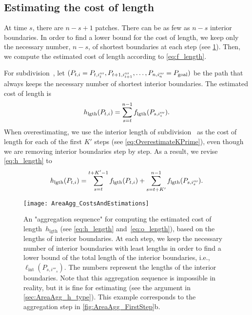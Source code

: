 \documentclass[acmsmall,natbib=false]{acmart}
\begin{document}
\subsection{Estimating the cost of length}
\label{sec:AreaAgg_h_length}

At time $s$, there are $n-s+1$ patches.
There can be as few as $n-s$ interior boundaries.
In order to find a lower bound for the cost of length,
we keep only the necessary number, $n-s$, 
of shortest boundaries at each step
(see \fig\ref{fig:AreaAgg_h_length}).
Then, we compute the estimated cost of length according to 
\eq\ref{eq:f_length}.

For subdivision~\Pnode, let
$(P_{t,i}=P_{t,i'''_t}, P_{t+1,i'''_{t+1}}, 
\dots,P_{n,i'''_n}=P_\mathrm{goal})$
be the path that always keeps 
the necessary number of shortest interior boundaries.
The estimated cost of length is
\begin{equation}
\label{eq:h_length}
h_\mathrm{lgth}(P_{t,i})=
\sum_{s=t}^{n-1}f_\mathrm{lgth}(P_{s,i'''_s}).
\end{equation}
When overestimating,
we use the interior length of subdivision~\Pnode
as the cost of length for each of the first $K'$ steps 
(see \eq\ref{eq:OverestimateKPrime}),
even though we are removing interior boundaries
step by step.
As a result, we revise \fo\ref{eq:h_length} to
\begin{equation}
\label{eq:o_length}
h_\mathrm{lgth}(P_{t,i})=
\sum_{s=t}^{t+K'-1}f_\mathrm{lgth}(P_{t,i})+
\sum_{s=t+K'}^{n-1}f_\mathrm{lgth}(P_{s,i'''_s}).
\end{equation}


\begin{figure*}[tb]
\centering
\texttt{[image: AreaAgg\_CostsAndEstimations]}
\caption{An "aggregation sequence" for computing 
	the estimated cost of length~$h_\mathrm{lgth}$ 
	(see \eqs\ref{eq:h_length} and~\ref{eq:o_length}),
	based on the lengths of interior boundaries. 
	At each step, we keep the necessary number 
	of interior boundaries with least lengths in order to find a 
	lower bound of the total length of the interior boundaries, 
	i.e., $\ell_\mathrm{int}(P_{s,i'''_s})$.
	The numbers represent the 
	lengths of the interior boundaries.
    Note that this aggregation sequence is impossible in reality,
    but it is fine for estimating
    (see the argument in \sect\ref{sec:AreaAgg_h_type}).    
	This example corresponds to the aggregation step in 
	\fig\ref{fig:AreaAgg_FirstStep}b.
}
\label{fig:AreaAgg_h_length}
\end{figure*}
\end{document}
